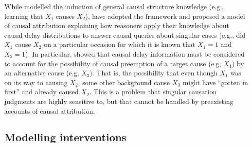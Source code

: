 \documentclass{cambridge7A}%
\begin{document}
While \cite{bramley2018time} modelled the induction of general causal structure knowledge (e.g., learning that $X_1$ causes $X_2$), \cite{stephan2018latency} have adopted the framework and proposed a model of causal attribution explaining how reasoners apply their knowledge about causal delay distributions to answer causal queries about singular cases (e.g., did $X_1$ cause $X_2$ on a particular occasion for which it is known that $X_1 = 1$ and $X_2 = 1$). In particular, \cite{stephan2018latency}  showed that causal delay information must be considered to account for the possibility of causal preemption of a target cause (e.g, $X_1$) by an alternative cause (e.g, $X_3$).  That is, the possibility that even though $X_1$ was on its way to causing $X_2$, some other background cause $X_3$ might have ``gotten in first'' and already caused $X_2$. This is a problem that singular causation judgments are highly sensitive to, but that cannot be handled by preexisting accounts of causal attribution.

\subsection{Modelling interventions}
\end{document}
